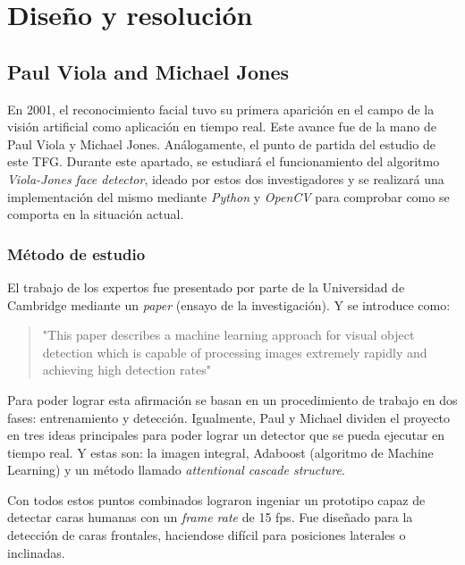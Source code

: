 
\chapter{Diseño y resolución}

\linespread{1.5}

\section{Paul Viola and Michael Jones}

En 2001, el reconocimiento facial tuvo su primera aparición en el campo de la visión artificial como aplicación en tiempo real. Este avance fue de la mano de Paul Viola y Michael Jones. Análogamente, el punto de partida del estudio de este TFG. Durante este apartado, se estudiará el funcionamiento del algoritmo \textit{Viola-Jones face detector}, ideado por estos dos investigadores y se realizará una implementación del mismo mediante \textit{Python} y \textit{OpenCV} para comprobar como se comporta en la situación actual.

\subsection*{Método de estudio}

El trabajo de los expertos fue presentado por parte de la Universidad de Cambridge mediante un \textit{paper} (ensayo de la investigación). Y se introduce como: 
\begin{quote}
	"This paper describes a machine learning approach for visual object detection which is capable of processing images extremely rapidly and achieving high detection rates" \cite{paulViola}
\end{quote}

Para poder lograr esta afirmación se basan en un procedimiento de trabajo en dos fases: entrenamiento y detección. Igualmente, Paul y Michael dividen el proyecto en tres ideas principales para poder lograr un detector que se pueda ejecutar en tiempo real. Y estas son: la imagen integral, Adaboost (algoritmo de Machine Learning) y un método llamado \textit{attentional cascade structure}. 

Con todos estos puntos combinados lograron ingeniar un prototipo capaz de detectar caras humanas con un \textit{frame rate} de 15 fps. Fue diseñado para la detección de caras frontales, haciendose difícil para posiciones laterales o inclinadas.

